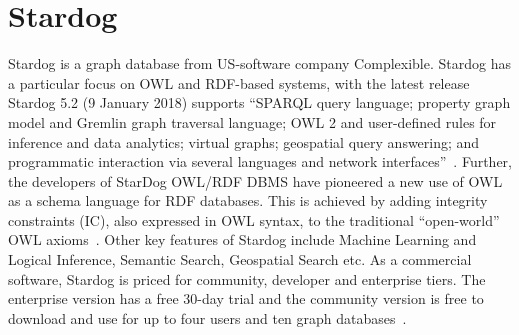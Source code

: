 \section{Stardog}
Stardog is a graph database from US-software company Complexible. Stardog has a particular 
focus on OWL and RDF-based systems, with the latest release Stardog 5.2 (9 January 2018) supports 
``SPARQL query language; property graph model and Gremlin graph traversal language; OWL 2 and 
user-defined rules for inference and data analytics; virtual graphs; geospatial query answering; and 
programmatic interaction via several languages and network 
interfaces''~\cite{hid-sp18-405-wwwdocs-stardog}. Further, the developers of StarDog OWL/RDF DBMS 
have pioneered a new use of OWL as a schema language for RDF databases. This is achieved by adding 
integrity constraints (IC), also expressed in OWL syntax, to the traditional ``open-world'' OWL 
axioms~\cite{hid-sp18-405-cer2012graphical-stardog}. Other key features of Stardog include Machine 
Learning and Logical Inference, Semantic Search, Geospatial Search etc. As a commercial software, 
Stardog is priced for community, developer and enterprise tiers. The enterprise version has a free 
30-day trial and the community version is free to download and use for up to four users and ten graph 
databases~\cite{hid-sp18-405-www-stardog}.



